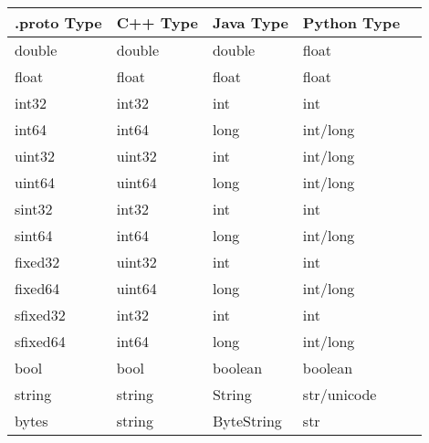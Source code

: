 \begin{longtable}[l]{@{}lllll@{}}
\toprule
.proto Type  & C++ Type & Java Type & Python Type\tabularnewline
\midrule
\endhead
double & double & double & float\tabularnewline
float & float & float & float\tabularnewline
int32 & int32 & int & int\tabularnewline
int64 & int64 & long & int/long\tabularnewline
uint32 & uint32 & int & int/long\tabularnewline
uint64 & uint64 & long & int/long\tabularnewline
sint32 & int32 & int & int\tabularnewline
sint64 & int64 & long & int/long\tabularnewline
fixed32 & uint32 & int & int\tabularnewline
fixed64 & uint64 & long & int/long\tabularnewline
sfixed32 & int32 & int & int\tabularnewline
sfixed64 & int64 & long & int/long\tabularnewline
bool & bool & boolean & boolean\tabularnewline
string & string & String & str/unicode\tabularnewline
bytes & string & ByteString & str\tabularnewline
\bottomrule
\end{longtable}
